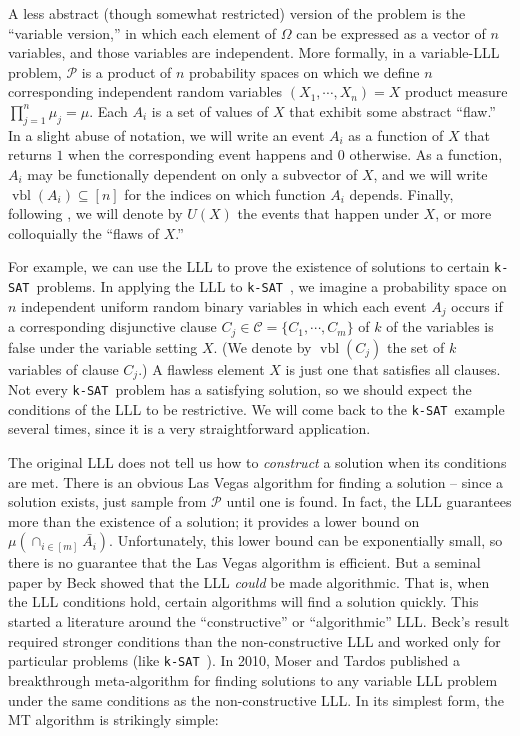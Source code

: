\documentclass[twocolumn]{article}
\newcommand{\ksat}{\texttt{k-SAT}~}
\begin{document}
A less abstract (though somewhat restricted) version of the problem is the ``variable version,'' in which each element of $\Omega$ can be expressed as a vector of $n$ variables, and those variables are independent.  More formally, in a variable-LLL problem, $\mathcal{P}$ is a product of $n$ probability spaces on which we define $n$ corresponding independent random variables $(X_1, \cdots, X_n) = X$ product measure $\prod_{j = 1}^{n} \mu_j  = \mu$.  Each $A_i$ is a set of values of $X$ that exhibit some abstract ``flaw.''  In a slight abuse of notation, we will write an event $A_i$ as a function of $X$ that returns $1$ when the corresponding event happens and $0$ otherwise.  As a function, $A_i$ may be functionally dependent on only a subvector of $X$, and we will write $\operatorname{vbl}(A_i) \subseteq [n]$ for the indices on which function $A_i$ depends.  Finally, following \cite{achlioptas2014random}, we will denote by $U(X)$ the events that happen under $X$, or more colloquially the ``flaws of $X$.''

For example, we can use the LLL to prove the existence of solutions to certain \ksat problems.  In applying the LLL to \ksat, we imagine a probability space on $n$ independent uniform random binary variables in which each event $A_j$ occurs if a corresponding disjunctive clause $C_j \in \mathcal{C} = \{C_1, \cdots, C_m\}$ of $k$ of the variables is false under the variable setting $X$.  (We denote by $\operatorname{vbl}(C_j)$ the set of $k$ variables of clause $C_j$.)  A flawless element $X$ is just one that satisfies all clauses.  Not every \ksat problem has a satisfying solution, so we should expect the conditions of the LLL to be restrictive.  We will come back to the \ksat example several times, since it is a very straightforward application.

The original LLL does not tell us how to \emph{construct} a solution when its conditions are met.  There is an obvious Las Vegas algorithm for finding a solution -- since a solution exists, just sample from $\mathcal{P}$ until one is found.  In fact, the LLL guarantees more than the existence of a solution; it provides a lower bound on $\mu(\cap_{i \in [m]} \bar{A_i})$.  Unfortunately, this lower bound can be exponentially small, so there is no guarantee that the Las Vegas algorithm is efficient.  But a seminal paper by Beck \cite{beck1991algorithmic} showed that the LLL \emph{could} be made algorithmic.  That is, when the LLL conditions hold, certain algorithms will find a solution quickly.  This started a literature around the ``constructive'' or ``algorithmic'' LLL.  Beck's result required stronger conditions than the non-constructive LLL and worked only for particular problems (like \ksat).  In 2010, Moser and Tardos \cite{moser2009constructive,moser2010constructive} published a breakthrough meta-algorithm for finding solutions to any variable LLL problem under the same conditions as the non-constructive LLL.  In its simplest form, the MT algorithm is strikingly simple:
\end{document}
